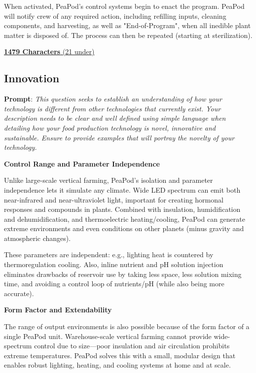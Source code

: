 \documentclass{report}
\begin{document}
When activated, PeaPod's control systems begin to enact the program. PeaPod will notify crew of any required action, including refilling inputs, cleaning components, and harvesting, as well as "End-of-Program", when all inedible plant matter is disposed of. The process can then be repeated (starting at sterilization).

\uline{\textbf{1479 Characters} (21 under)}

\newpage

\subsection{Innovation}
\label{sec:innovation}

\textbf{Prompt}: \textit{This question seeks to establish an understanding of how your technology is different from other technologies that currently exist. Your description needs to be clear and well defined using simple language when detailing how your food production technology is novel, innovative and sustainable. Ensure to provide examples that will portray the novelty of your technology.}


\textbf{Control Range and Parameter Independence}

Unlike large-scale vertical farming, PeaPod’s isolation and parameter independence lets it simulate any climate. Wide LED spectrum can emit both near-infrared and near-ultraviolet light, important for creating hormonal responses and compounds in plants. Combined with insulation, humidification and dehumidification, and thermoelectric heating/cooling, PeaPod can generate extreme environments and even conditions on other planets (minus gravity and atmospheric changes). 

These parameters are independent: e.g., lighting heat is countered by thermoregulation cooling. Also, inline nutrient and pH solution injection eliminates drawbacks of reservoir use by taking less space, less solution mixing time, and avoiding a control loop of nutrients/pH (while also being more accurate). 


\textbf{Form Factor and Extendability}

The range of output environments is also possible because of the form factor of a single PeaPod unit. Warehouse-scale vertical farming cannot provide wide-spectrum control due to size---poor insulation and air circulation prohibits extreme temperatures. PeaPod solves this with a small, modular design that enables robust lighting, heating, and cooling systems at home and at scale.
\end{document}
